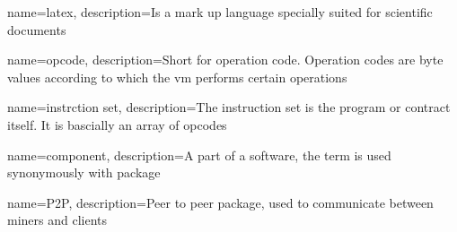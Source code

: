 \makeglossaries

{
        name=latex,
        description={Is a mark up language specially suited for
scientific documents}
}


{
        name=opcode,
        description={Short for operation code. Operation codes are byte values according to which the vm performs certain operations}
}

{
        name=instrction set,
        description={The instruction set is the program or contract itself. It is bascially an array of opcodes}
}

{
        name=component,
        description={A part of a software, the term is used synonymously with package}
}

{
        name=P2P,
        description={Peer to peer package, used to communicate between miners and clients}
}
